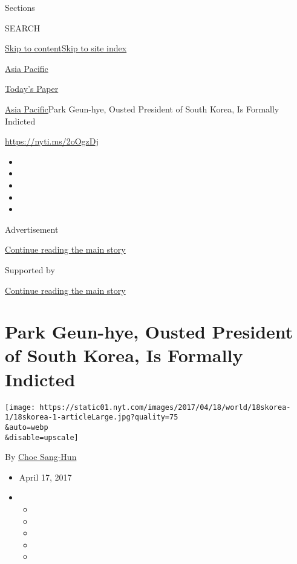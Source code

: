 Sections

SEARCH

\protect\hyperlink{site-content}{Skip to
content}\protect\hyperlink{site-index}{Skip to site index}

\href{https://www.nytimes.com/section/world/asia}{Asia Pacific}

\href{https://myaccount.nytimes.com/auth/login?response_type=cookie\&client_id=vi}{}

\href{https://www.nytimes.com/section/todayspaper}{Today's Paper}

\href{/section/world/asia}{Asia Pacific}\textbar{}Park Geun-hye, Ousted
President of South Korea, Is Formally Indicted

\url{https://nyti.ms/2oOgzDj}

\begin{itemize}
\item
\item
\item
\item
\item
\end{itemize}

Advertisement

\protect\hyperlink{after-top}{Continue reading the main story}

Supported by

\protect\hyperlink{after-sponsor}{Continue reading the main story}

\hypertarget{park-geun-hye-ousted-president-of-south-korea-is-formally-indicted}{%
\section{Park Geun-hye, Ousted President of South Korea, Is Formally
Indicted}\label{park-geun-hye-ousted-president-of-south-korea-is-formally-indicted}}

\texttt{[image: https://static01.nyt.com/images/2017/04/18/world/18skorea-1/18skorea-1-articleLarge.jpg?quality=75\\\&auto=webp\\\&disable=upscale]}

By \href{http://www.nytimes.com/by/choe-sang-hun}{Choe Sang-Hun}

\begin{itemize}
\item
  April 17, 2017
\item
  \begin{itemize}
  \item
  \item
  \item
  \item
  \item
  \end{itemize}
\end{itemize}

